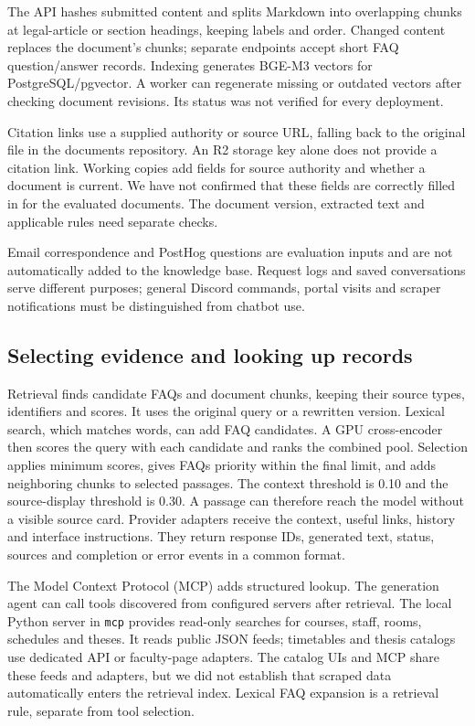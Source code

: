 \documentclass[a4paper,10pt,twocolumn]{article}
\begin{document}
The API hashes submitted content and splits Markdown into overlapping chunks at legal-article or section headings, keeping labels and order. Changed content replaces the document's chunks; separate endpoints accept short FAQ question/answer records. Indexing generates BGE-M3 vectors for PostgreSQL/pgvector. A worker can regenerate missing or outdated vectors after checking document revisions. Its status was not verified for every deployment.

Citation links use a supplied authority or source URL, falling back to the original file in the documents repository. An R2 storage key alone does not provide a citation link. Working copies add fields for source authority and whether a document is current. We have not confirmed that these fields are correctly filled in for the evaluated documents. The document version, extracted text and applicable rules need separate checks.

Email correspondence and PostHog questions are evaluation inputs and are not automatically added to the knowledge base. Request logs and saved conversations serve different purposes; general Discord commands, portal visits and scraper notifications must be distinguished from chatbot use.

\subsection{Selecting evidence and looking up records}
Retrieval finds candidate FAQs and document chunks, keeping their source types, identifiers and scores. It uses the original query or a rewritten version. Lexical search, which matches words, can add FAQ candidates. A GPU cross-encoder then scores the query with each candidate and ranks the combined pool. Selection applies minimum scores, gives FAQs priority within the final limit, and adds neighboring chunks to selected passages. The context threshold is 0.10 and the source-display threshold is 0.30. A passage can therefore reach the model without a visible source card. Provider adapters receive the context, useful links, history and interface instructions. They return response IDs, generated text, status, sources and completion or error events in a common format.

The Model Context Protocol (MCP) adds structured lookup. The generation agent can call tools discovered from configured servers after retrieval. The local Python server in \texttt{mcp} provides read-only searches for courses, staff, rooms, schedules and theses. It reads public JSON feeds; timetables and thesis catalogs use dedicated API or faculty-page adapters. The catalog UIs and MCP share these feeds and adapters, but we did not establish that scraped data automatically enters the retrieval index. Lexical FAQ expansion is a retrieval rule, separate from tool selection.
\end{document}
